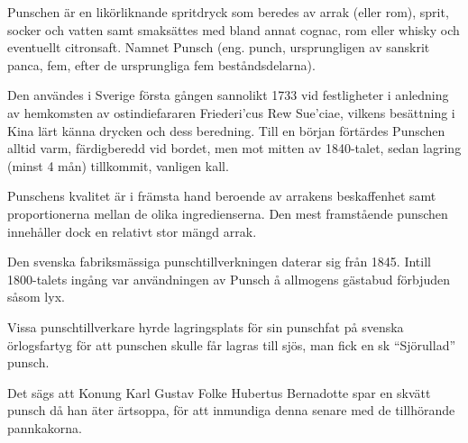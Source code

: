 \vspace{10pt}
\setlength{\parindent}{15pt}
Punschen är en likörliknande spritdryck som beredes av arrak (eller
rom), sprit, socker och vatten samt smaksättes med bland annat cognac,
rom eller whisky och eventuellt citronsaft. Namnet Punsch (eng. punch,
ursprungligen av sanskrit panca, fem, efter de ursprungliga fem
beståndsdelarna).

Den användes i Sverige första gången sannolikt 1733 vid festligheter i
anledning av hemkomsten av ostindiefararen Friederi'cus Rew Sue'ciae,
vilkens besättning i Kina lärt känna drycken och dess beredning. Till
en början förtärdes Punschen alltid varm, färdigberedd vid bordet, men
mot mitten av 1840-talet, sedan lagring (minst 4 mån) tillkommit,
vanligen kall.

Punschens kvalitet är i främsta hand beroende av arrakens beskaffenhet
samt proportionerna mellan de olika ingredienserna. Den mest
framstående punschen innehåller dock en relativt stor mängd arrak.

Den svenska fabriksmässiga punschtillverkningen daterar sig från
1845. Intill 1800-talets ingång var användningen av Punsch å allmogens
gästabud förbjuden såsom lyx.

Vissa punschtillverkare hyrde lagringsplats för sin punschfat på
svenska örlogsfartyg för att punschen skulle får lagras till sjös, man
fick en sk ``Sjörullad'' punsch.

Det sägs att Konung Karl Gustav Folke Hubertus Bernadotte spar en
skvätt punsch då han äter ärtsoppa, för att inmundiga denna senare med
de tillhörande pannkakorna.
\setlength{\parindent}{0pt}

